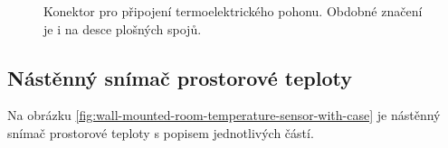 \begin{Czech}
\begin{figure}[H]
    \centering
    \def\svgwidth{0.15\columnwidth}
    \graphicspath{{pictures/all/hardware/svg/}}
    
    \caption{Konektor pro připojení termoelektrického pohonu. Obdobné značení je i na desce plošných spojů.}
    \label{fig:zone-controller-terminal-block}
\end{figure}
\end{Czech}


\newpage
\begin{Czech}
\subsection{Nástěnný snímač prostorové teploty}
\end{Czech}

\begin{Czech}
Na obrázku \ref{fig:wall-mounted-room-temperature-sensor-with-case} je nástěnný snímač prostorové teploty s popisem jednotlivých částí.
\end{Czech}

